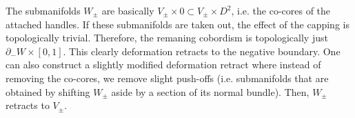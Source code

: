 The submanifolds $W_\pm$ are basically $V_\pm \times 0 \subset V_\pm \times D^2$, i.e. 
the co-cores of the attached handles.
If these submanifolds are taken out, the effect of the capping is topologically trivial.
Therefore, the remaning cobordism is topologically just $\partial_- W\times [0,1]$.
This clearly deformation retracts to the negative boundary.
One can also construct a slightly modified deformation retract where instead 
of removing the co-cores, we remove slight push-offs 
(i.e. submanifolds that are obtained by shifting $W_\pm$ aside by a section of its normal bundle).
Then, $W_\pm$ retracts to $V_\pm$.